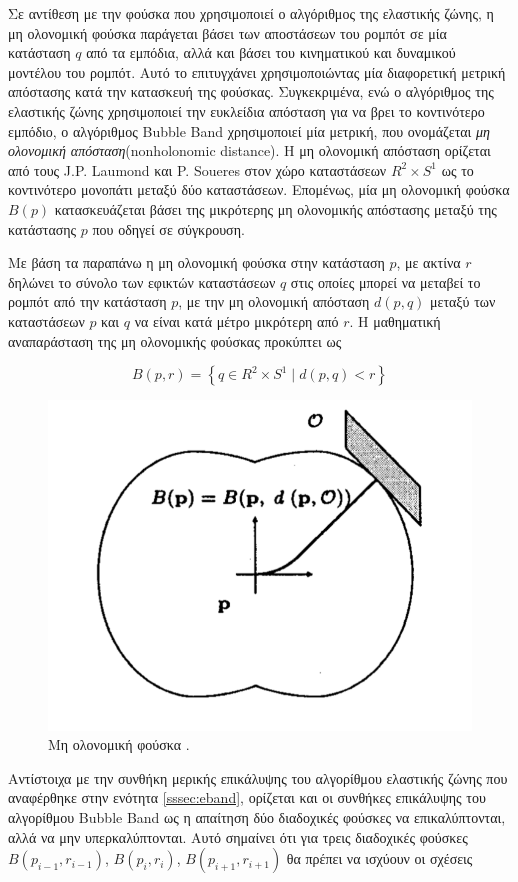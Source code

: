 \bigskip
Σε αντίθεση με την φούσκα που χρησιμοποιεί ο αλγόριθμος της ελαστικής ζώνης, η μη ολονομική φούσκα παράγεται βάσει των αποστάσεων του ρομπότ σε μία κατάσταση $q$ από τα εμπόδια, αλλά και βάσει του κινηματικού και δυναμικού μοντέλου του ρομπότ. Αυτό το επιτυγχάνει χρησιμοποιώντας μία διαφορετική μετρική απόστασης κατά την κατασκευή της φούσκας. Συγκεκριμένα, ενώ ο αλγόριθμος της ελαστικής ζώνης χρησιμοποιεί την ευκλείδια απόσταση για να βρει το κοντινότερο εμπόδιο, ο αλγόριθμος Bubble Band χρησιμοποιεί μία μετρική, που ονομάζεται \textit{μη ολονομική απόσταση}(nonholonomic distance). Η μη ολονομική απόσταση ορίζεται από τους J.P. Laumond και P. Soueres \cite{rs_metric} στον χώρο καταστάσεων $R^2 \times S^1$ ως το κοντινότερο μονοπάτι μεταξύ δύο καταστάσεων. Επομένως, μία μη ολονομική φούσκα $B(p)$ κατασκευάζεται βάσει της μικρότερης μη ολονομικής απόστασης μεταξύ της κατάστασης $p$ που οδηγεί σε σύγκρουση.

\bigskip
Με βάση τα παραπάνω η μη ολονομική φούσκα στην κατάσταση $p$, με ακτίνα $r$ δηλώνει το σύνολο των εφικτών καταστάσεων $q$ στις οποίες μπορεί να μεταβεί το ρομπότ από την κατάσταση $p$, με την μη ολονομική απόσταση $d(p,q)$ μεταξύ των καταστάσεων $p$ και $q$ να είναι κατά μέτρο μικρότερη από $r$. Η μαθηματική αναπαράσταση της μη ολονομικής φούσκας προκύπτει ως

\begin{equation}
	B(p,r) = \left\{q \in R^2 \times S^1 \; | \; d(p,q)<r \right\}
\end{equation}

\begin{figure}[!ht]
	\centering
	\includegraphics[width=0.4\linewidth]{Chapters/Chapter3/Figures/nh_bubble.png}
	\caption[Μη ολονομική φούσκα.]{Μη ολονομική φούσκα \cite{dpm}.}
	\label{fig:nh_bubble}
\end{figure}

Αντίστοιχα με την συνθήκη μερικής επικάλυψης του αλγορίθμου ελαστικής ζώνης που αναφέρθηκε στην ενότητα \ref{sssec:eband}, ορίζεται και οι συνθήκες επικάλυψης του αλγορίθμου Bubble Band ως η απαίτηση δύο διαδοχικές φούσκες να επικαλύπτονται, αλλά να μην υπερκαλύπτονται. Αυτό σημαίνει ότι για τρεις διαδοχικές φούσκες $B(p_{i-1},r_{i-1})$, $B(p_i,r_i)$, $B(p_{i+1},r_{i+1})$ θα πρέπει να ισχύουν οι σχέσεις

